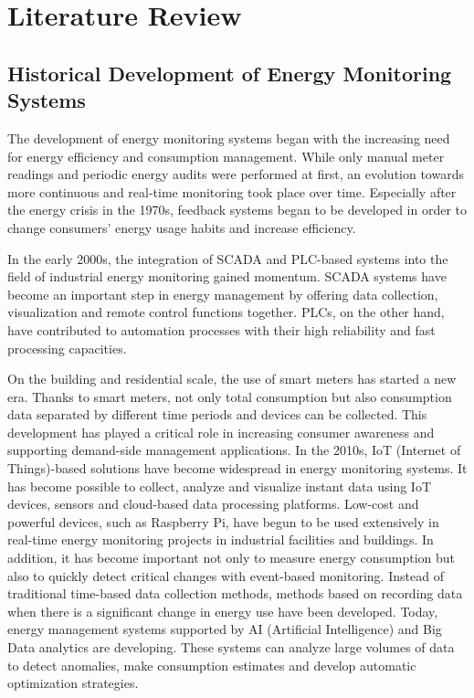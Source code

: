 \doublespacing %

\chapter{Literature Review}
\label{ch2}

\begin{spacing}{1} %
\minitoc %
\end{spacing} %
\thesisspacing %


\section{Historical Development of Energy Monitoring Systems}

The development of energy monitoring systems began with the increasing need for energy efficiency and consumption management. While only manual meter readings and periodic energy audits were performed at first, an evolution towards more continuous and real-time monitoring took place over time. Especially after the energy crisis in the 1970s, feedback systems began to be developed in order to change consumers' energy usage habits and increase efficiency.

In the early 2000s, the integration of SCADA and PLC-based systems into the field of industrial energy monitoring gained momentum. SCADA systems have become an important step in energy management by offering data collection, visualization and remote control functions together. PLCs, on the other hand, have contributed to automation processes with their high reliability and fast processing capacities.

On the building and residential scale, the use of smart meters has started a new era. Thanks to smart meters, not only total consumption but also consumption data separated by different time periods and devices can be collected. This development has played a critical role in increasing consumer awareness and supporting demand-side management applications.
In the 2010s, IoT (Internet of Things)-based solutions have become widespread in energy monitoring systems. It has become possible to collect, analyze and visualize instant data using IoT devices, sensors and cloud-based data processing platforms. Low-cost and powerful devices, such as Raspberry Pi, have begun to be used extensively in real-time energy monitoring projects in industrial facilities and buildings. In addition, it has become important not only to measure energy consumption but also to quickly detect critical changes with event-based monitoring. Instead of traditional time-based data collection methods, methods based on recording data when there is a significant change in energy use have been developed. Today, energy management systems supported by AI (Artificial Intelligence) and Big Data analytics are developing. These systems can analyze large volumes of data to detect anomalies, make consumption estimates and develop automatic optimization strategies.

